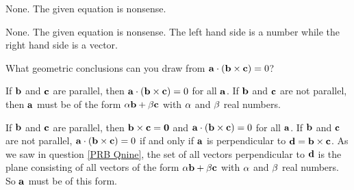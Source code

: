 
\begin{answer}
None. The given equation is nonsense.
\end{answer}

\begin{solution}
None. The given equation is nonsense. The left hand side is
a number while the right hand side is a vector.
\end{solution}

\begin{question}
What geometric conclusions can you draw from
$\mathbf{a}\cdot(\mathbf{b}\times\mathbf{c})=0$?
\end{question}


\begin{answer}
If $\mathbf{b}$ and $\mathbf{c}$ are parallel, then $\mathbf{a}\cdot(\mathbf{b}\times\mathbf{c})=0$ for all $\mathbf{a}$.
If $\mathbf{b}$ and $\mathbf{c}$ are not parallel, then $\mathbf{a}$ must be of the form  
$\alpha\mathbf{b}+\beta\mathbf{c}$ with $\alpha$ and $\beta$ real numbers.
\end{answer}

\begin{solution}
If $\mathbf{b}$ and $\mathbf{c}$ are parallel, then $\mathbf{b}\times\mathbf{c}=\mathbf{0}$
and $\mathbf{a}\cdot(\mathbf{b}\times\mathbf{c})=0$ for all $\mathbf{a}$.
If $\mathbf{b}$ and $\mathbf{c}$ are not parallel, $\mathbf{a}\cdot(\mathbf{b}\times\mathbf{c})=0$ 
if and only if $\mathbf{a}$ is perpendicular to $\mathbf{d}=\mathbf{b}\times\mathbf{c}$.
As we saw in question \ref{PRB Qnine}, the set of all vectors perpendicular to
$\mathbf{d}$ is the plane consisting of all vectors of the form  
$\alpha\mathbf{b}+\beta\mathbf{c}$ with $\alpha$ and $\beta$ real numbers. So $\mathbf{a}$ must
be of this form.
\end{solution}

